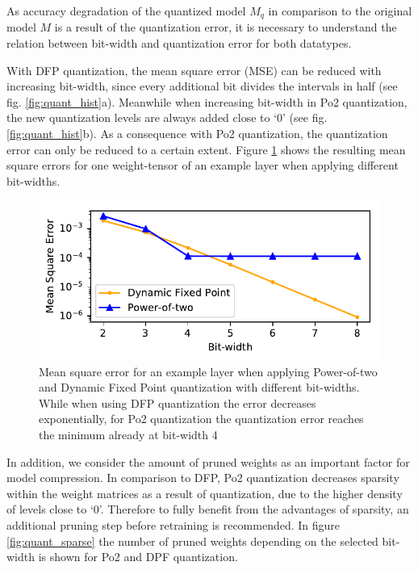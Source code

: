 As accuracy degradation of the quantized model $M_q$ in comparison to the original model $M$ is a result of the quantization error, it is necessary to understand the relation between bit-width and quantization error for both datatypes.

With DFP quantization, the mean square error (MSE) can be reduced with 
increasing bit-width, since every additional bit divides the intervals in 
half (see fig. \ref{fig:quant_hist}a). 
Meanwhile when increasing bit-width in Po2 quantization, the new quantization levels are always added close to `0' (see fig. \ref{fig:quant_hist}b). As a consequence with Po2 quantization, the quantization error can only be reduced to a certain extent. Figure \ref{fig:quant_mse} shows the resulting mean square errors for one weight-tensor of an example layer when applying different bit-widths.

\begin{figure}[t]
\includegraphics[width=\columnwidth]{img/mse.pdf}
\caption{Mean square error for an example layer when applying Power-of-two and Dynamic Fixed Point quantization with different bit-widths. While when using DFP quantization the error decreases exponentially, for Po2 quantization the quantization error reaches the minimum already at bit-width 4}\label{fig:quant_mse}
\end{figure}

In addition, we consider the amount of pruned weights as an important factor for model compression. In comparison to DFP, Po2 quantization decreases sparsity within the weight matrices as a result of quantization, due to the higher density of levels close to `0'. Therefore to fully benefit from the advantages of sparsity, an additional pruning step before retraining is recommended. In figure \ref{fig:quant_sparse} the number of pruned weights depending on the selected bit-width is shown for Po2 and DPF quantization.

